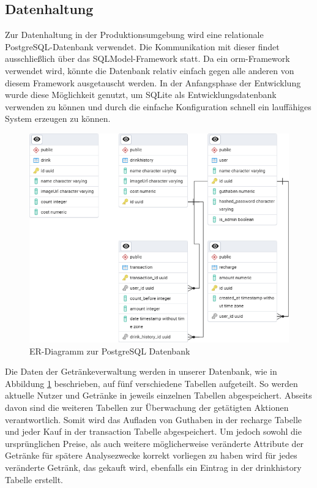 \documentclass[conference,a4paper]{cs-techrep}
\begin{document}
\subsection{Datenhaltung} %
Zur Datenhaltung in der Produktionsumgebung wird eine relationale PostgreSQL-Datenbank verwendet. 
Die Kommunikation mit dieser findet ausschließlich über das SQLModel-Framework statt. 
Da ein \ac{orm}-Framework verwendet wird, könnte die Datenbank relativ einfach gegen alle anderen von diesem Framework ausgetauscht werden. 
In der Anfangsphase der Entwicklung wurde diese Möglichkeit genutzt, um SQLite \cite{sqlite} als Entwicklungsdatenbank verwenden zu können und durch die einfache Konfiguration schnell ein lauffähiges System erzeugen zu können.
\begin{figure}[h]
	\centering
	\includegraphics[width=0.9\linewidth]{database_erd}
	\caption{ER-Diagramm zur PostgreSQL Datenbank}
	\label{fig:erd-modell-datenbank}
\end{figure}

Die Daten der Getränkeverwaltung werden in unserer Datenbank, wie in Abbildung \ref{fig:erd-modell-datenbank} beschrieben, auf fünf verschiedene Tabellen aufgeteilt. So werden aktuelle Nutzer und Getränke in jeweils einzelnen Tabellen abgespeichert. Abseits davon sind die weiteren Tabellen zur Überwachung der getätigten Aktionen verantwortlich. Somit wird das Aufladen von Guthaben in der recharge Tabelle und jeder Kauf in der transaction Tabelle abgespeichert. Um jedoch sowohl die ursprünglichen Preise, als auch weitere möglicherweise veränderte Attribute der Getränke für spätere Analysezwecke korrekt vorliegen zu haben wird für jedes veränderte Getränk, das gekauft wird, ebenfalls ein Eintrag in der drinkhistory Tabelle erstellt.
\end{document}
